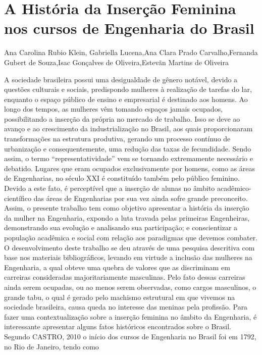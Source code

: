 

\section{A História da Inserção Feminina nos cursos de Engenharia do Brasil}

Ana Carolina Rubio Klein, Gabriella Lucena,Ana Clara Prado Carvalho,Fernanda Gubert de Souza,Isac Gonçalves de Oliveira,Estevãn Martins de Oliveira

A sociedade brasileira possui uma desigualdade de gênero notável, devido a questões
culturais e sociais, predispondo mulheres à realização de tarefas do lar, enquanto o espaço
público de ensino e empresarial é destinado aos homens.
Ao longo dos tempos, as mulheres vêm tomando espaços jamais ocupados, possibilitando
a inserção da própria no mercado de trabalho. Isso se deve ao avanço e ao crescimento da
industrialização no Brasil, aos quais proporcionaram transformações na estrutura produtiva,
gerando um processo contínuo de urbanização e consequentemente, uma redução das taxas de
fecundidade. Sendo assim, o termo “representatividade” vem se tornando extremamente
necessário e debatido. Lugares que eram ocupados exclusivamente por homens, como as áreas de
Engenharias, no século XXI é constituído também pelo público feminino. Devido a este fato, é
perceptível que a inserção de alunas no âmbito acadêmico-científico das áreas de Engenharias
por sua vez ainda sofre grande preconceito.
Assim, o presente trabalho tem como objetivo apresentar a história da inserção da mulher
na Engenharia, expondo a luta travada pelas primeiras Engenheiras, demonstrando sua evolução
e analisando sua participação; e conscientizar a população acadêmica e social com relação aos
paradigmas que devemos combater.
O desenvolvimento deste trabalho se deu através de uma pesquisa descritiva com base
nos materiais bibliográficos, levando em virtude a inclusão das mulheres na Engenharia, a qual
obteve uma quebra de valores que as discriminam em carreiras consideradas majoritariamente
masculinas. Pelo fato dessas carreiras ainda serem ocupadas, ou ao menos serem observadas,
como cargos masculinos, o grande tabu, o qual é gerado pelo machismo estrutural em que
vivemos na sociedade brasileira, causa queda no interesse das meninas pela profissão.
Para fazer uma contextualização sobre a inserção feminina no âmbito da Engenharia, é
interessante apresentar alguns fatos históricos encontrados sobre o Brasil. Segundo CASTRO,
2010 o início dos cursos de Engenharia no Brasil foi em 1792, no Rio de Janeiro, tendo como
